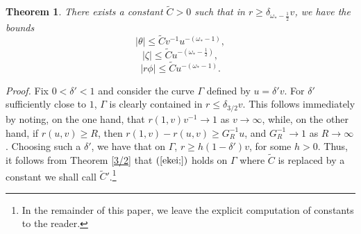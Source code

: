 \documentclass{article}
\newtheorem{theorem}{Theorem}[section]
\begin{document}
\begin{theorem}
\label{nulinf1}
There exists a constant $\tilde{C}>0$ such that
in $r\ge \delta_{\omega_*-\frac12}v$, we have the bounds
\begin{equation}
\label{**}
|\theta|\le \tilde{C}v^{-1}u^{-(\omega_*-1)},
\end{equation}
\[
|\zeta|\le \tilde{C}u^{-\left(\omega_*-\frac12\right)},
\]
\begin{equation}
\label{ekei;}
|r\phi|\le \tilde{C}u^{-(\omega_*-1)}.
\end{equation}
\end{theorem}

\noindent\emph{Proof.}
Fix $0<\delta'<1$ and consider the curve $\Gamma$ defined by $u=\delta' v$. 
For $\delta'$ sufficiently close
to $1$, $\Gamma$ is clearly contained in $r\le\delta_{3/2}v$. This 
follows immediately by noting, on the one hand, that
$r(1,v)v^{-1}\to1$ as $v\to\infty$,
while, on the other hand, if $r(u,v)\ge R$, then
$r(1,v)-r(u,v)\ge G_R^{-1}u$, and $G_R^{-1}\to 1$ as $R\to\infty$.
Choosing such a $\delta'$, we have 
that on $\Gamma$, $r\ge h(1-\delta')v$, for some $h>0$.
Thus, it follows from Theorem \ref{3/2} that $(\ref{ekei;})$ holds
on $\Gamma$ where $\tilde{C}$ is replaced by a constant we shall call 
$\tilde{C}'$.\footnote{In the remainder of this paper, we leave the explicit
computation of constants to the reader.}
\end{document}
